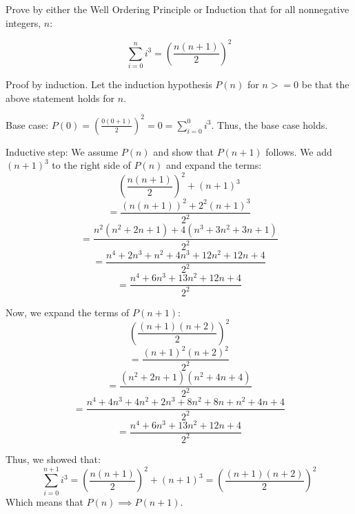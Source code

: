 \documentclass[../main.tex]{subfiles}
\begin{document}
\begin{questions}

\question Prove by either the Well Ordering Principle or Induction that for all nonnegative integers, $n$:

$$
\sum_{i=0}^{n} i^3 = \left(\frac{n(n+1)}{2}\right)^2
$$

\begin{solution}

  Proof by induction. Let the induction hypothesis $P(n)$ for $n >= 0$ be that the above statement holds for $n$.

  Base case: $P(0) = \left(\frac{0(0+1)}{2}\right)^2 = 0 = \sum_{i=0}^{0} i^3$. Thus, the base case holds.
  
  Inductive step: We assume $P(n)$ and show that $P(n+1)$ follows. We add $(n+1)^3$ to the right side of $P(n)$ and expand the terms:
  $$
  \left(\frac{n(n+1)}{2}\right)^2 + (n+1)^3
  $$
  $$
  = \frac{(n(n+1))^2 + 2^2(n+1)^3}{2^2}
  $$
  $$
  = \frac{n^2(n^2+2n+1) + 4(n^3+3n^2+3n+1)}{2^2}
  $$
  $$
  = \frac{n^4+2n^3+n^2+4n^3+12n^2+12n+4}{2^2}
  $$
  $$
  = \frac{n^4+6n^3+13n^2+12n+4}{2^2}
  $$

  Now, we expand the terms of $P(n+1)$:
  $$
  \left(\frac{(n+1)(n+2)}{2}\right)^2
  $$
  $$
  = \frac{(n+1)^2(n+2)^2}{2^2}
  $$
  $$
  = \frac{(n^2+2n+1)(n^2+4n+4)}{2^2}
  $$
  $$
  = \frac{n^4+4n^3+4n^2+2n^3+8n^2+8n+n^2+4n+4}{2^2}
  $$
  $$
  = \frac{n^4+6n^3+13n^2+12n+4}{2^2}
  $$

  Thus, we showed that:
  $$
  \sum_{i=0}^{n+1} i^3 = \left(\frac{n(n+1)}{2}\right)^2 + (n+1)^3 = \left(\frac{(n+1)(n+2)}{2}\right)^2
  $$
  Which means that $P(n) \implies P(n+1)$.


\end{solution}
\end{questions}
\end{document}
